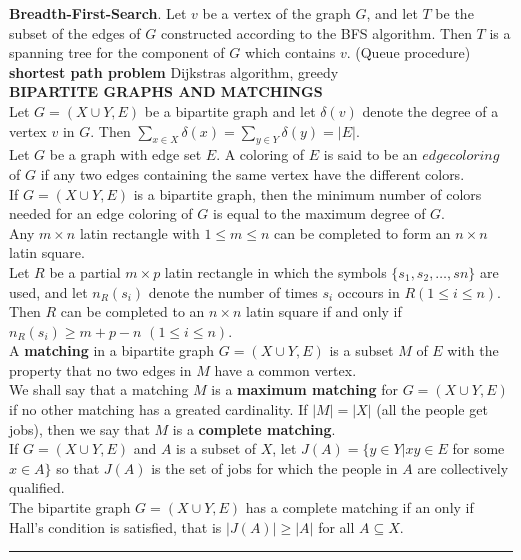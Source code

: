 \documentclass[10pt,landscape]{article}
\begin{document}
\begin{multicols}{4}
\textbf{Breadth-First-Search}. Let $v$ be a vertex of the graph $G$,
and let $T$ be  the subset of the edges of $G$ constructed according
to the BFS algorithm. Then $T$ is a spanning tree for the component of
$G$ which contains $v$. (Queue procedure)\\

\textbf{shortest path problem} Dijkstras algorithm, greedy\\


\textbf{BIPARTITE GRAPHS AND MATCHINGS}\\

Let $G = (X \cup Y, E)$ be a bipartite graph and let $\delta(v)$
denote the degree of a vertex $v$ in $G$. Then $\displaystyle\sum_{x
  \in X} \delta(x) = \displaystyle\sum_{y \in Y} \delta(y) = |E|$.\\

Let $G$ be a graph with edge set $E$. A coloring of $E$ is said to be
an $edge coloring$ of $G$ if any two edges containing the same vertex
have the different colors.\\

If $G = (X \cup Y, E)$ is a bipartite graph, then the minimum number
of colors needed for an edge coloring of $G$ is equal to the maximum
degree of $G$.\\

Any $m \times n$ latin rectangle with $1 \leq m \leq n$ can be
completed to form an $n \times n$ latin square.\\

Let $R$ be a partial $m \times p$ latin rectangle in which the symbols
$\{s_{1}, s_{2}, \dots,s{n}\}$ are used, and let $n_{R}(s_{i})$ denote
the number of times $s_{i}$ occours in $R(1 \leq i \leq n)$. Then $R$
can be completed to an $n \times n$ latin square if and only if
$n_{R}(s_{i}) \geq m + p - n$ $(1 \leq i \leq n)$.\\

A \textbf{matching} in a bipartite graph $G = (X \cup Y, E)$ is a
subset $M$ of $E$ with the property that no two edges in $M$ have a
common vertex.\\

We shall say that a matching $M$ is a \textbf{maximum matching} for $G
=(X \cup Y,E)$ if no other matching has a greated cardinality. If $|M|
= |X|$ (all the people get jobs), then we say that $M$ is a
\textbf{complete matching}.\\

If $G = (X \cup Y, E)$ and $A$ is a subset of $X$, let $J(A) = \{y \in
Y | xy \in E$ for some $x \in A\}$ so that $J(A)$ is the set of jobs
for which the people in $A$ are collectively qualified.\\

The bipartite graph $G = (X \cup Y, E)$ has a complete matching if an
only if Hall's condition is satisfied, that is $|J(A)| \geq |A|$ for
all $A \subseteq X$.\\ 

\rule{0.3\linewidth}{0.25pt}
\scriptsize


\end{multicols}
\end{document}
